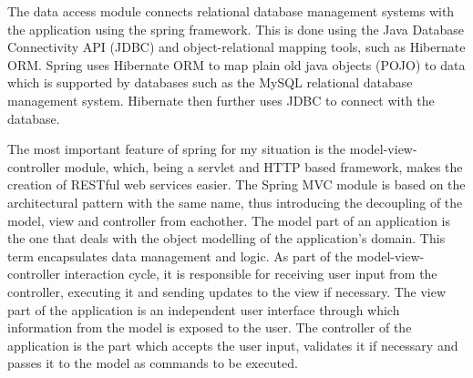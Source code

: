 \documentclass[12pt,a4paper,twoside]{report}
\begin{document}
The data access module connects relational database management systems with the application using the spring framework. This is done using the Java Database Connectivity API (JDBC) and object-relational mapping tools, such as Hibernate ORM. Spring uses Hibernate ORM to map plain old java objects (POJO) to data which is supported by databases such as the MySQL relational database management system. Hibernate then further uses JDBC to connect with the database.

The most important feature of spring for my situation is the model-view-controller module, which, being a servlet and HTTP based framework, makes the creation of RESTful web services easier. The Spring MVC module is based on the architectural pattern with the same name, thus introducing the decoupling of the model, view and controller from eachother. The model part of an application is the one that deals with the object modelling of the application's domain. This term encapsulates data management and logic. As part of the model-view-controller interaction cycle, it is responsible for receiving user input from the controller, executing it and sending updates to the view if necessary. The view part of the application is an independent user interface through which information from the model is exposed to the user. The controller of the application is the part which accepts the user input, validates it if necessary and passes it to the model as commands to be executed.
\end{document}

